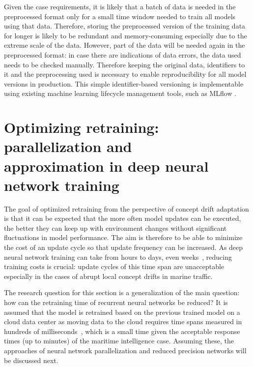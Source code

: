Given the case requirements, it is likely that a batch of data is needed in the preprocessed format only for a small time window needed to train all models using that data. Therefore, storing the preprocessed version of the training data for longer is likely to be redundant and memory-consuming especially due to the extreme scale of the data. However, part of the data will be needed again in the preprocessed format: in case there are indications of data errors, the data used needs to be checked manually. Therefore keeping the original data, identifiers to it and the preprocessing used is necessary to enable reproducibility for all model versions in production. This simple identifier-based versioning is implementable using existing machine learning lifecycle management tools, such as MLflow \cite{mlflow}.

\section[Optimizing retraining: parallelization and approximation in deep neural network training]{Optimizing retraining: parallelization and \\approximation in deep neural network training}



The goal of optimized retraining from the perspective of concept drift adaptation is that it can be expected that the more often model updates can be executed, the better they can keep up with environment changes without significant fluctuations in model performance. The aim is therefore to be able to minimize the cost of an update cycle so that update frequency can be increased. As deep neural network training can take from hours to days, even weeks~\cite{szeEfficientProcessingDeep2017}, reducing training costs is crucial: update cycles of this time span are unacceptable especially in the cases of abrupt local concept drifts in marine traffic.

The research question for this section is a generalization of the main question: how can the retraining time of recurrent neural networks be reduced? It is assumed that the model is retrained based on the previous trained model on a cloud data center as moving data to the cloud requires time spans measured in hundreds of milliseconds~\cite{edgelatency}, which is a small time given the acceptable response times (up to minutes) of the maritime intelligence case. Assuming these, the approaches of neural network parallelization and reduced precision networks will be discussed next.

